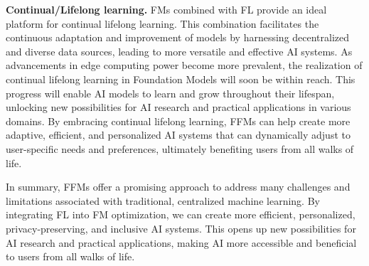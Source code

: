 \textbf{Continual/Lifelong learning.} 
FMs combined with FL provide an ideal platform for continual lifelong learning. This combination facilitates the continuous adaptation and improvement of models by harnessing decentralized and diverse data sources, leading to more versatile and effective AI systems. As advancements in edge computing power become more prevalent, the realization of continual lifelong learning in Foundation Models will soon be within reach. This progress will enable AI models to learn and grow throughout their lifespan, unlocking new possibilities for AI research and practical applications in various domains. By embracing continual lifelong learning, FFMs can help create more adaptive, efficient, and personalized AI systems that can dynamically adjust to user-specific needs and preferences, ultimately benefiting users from all walks of life.







In summary, FFMs offer a promising approach to address many challenges and limitations associated with traditional, centralized machine learning. By integrating FL into FM optimization, we can create more efficient, personalized, privacy-preserving, and inclusive AI systems. This opens up new possibilities for AI research and practical applications, making AI more accessible and beneficial to users from all walks of life.








